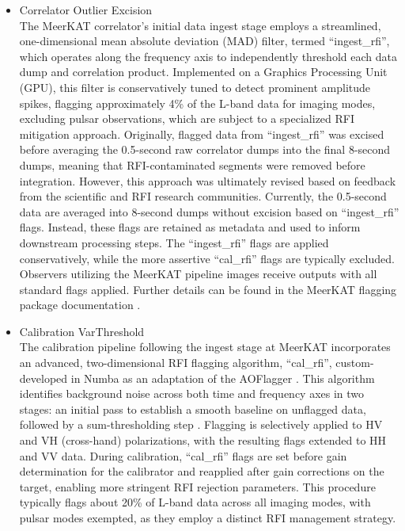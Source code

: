 \begin{itemize}
\item Correlator Outlier Excision\\
The MeerKAT correlator's initial data ingest stage employs a streamlined, one-dimensional mean absolute deviation (MAD) filter, termed ``ingest\_rfi'', which operates along the frequency axis to independently threshold each data dump and correlation product. Implemented on a Graphics Processing Unit (GPU), this filter is conservatively tuned to detect prominent amplitude spikes, flagging approximately 4\% of the L-band data for imaging modes, excluding pulsar observations, which are subject to a specialized RFI mitigation approach. Originally, flagged data from ``ingest\_rfi'' was excised before averaging the 0.5-second raw correlator dumps into the final 8-second dumps, meaning that RFI-contaminated segments were removed before integration. However, this approach was ultimately revised based on feedback from the scientific and RFI research communities.
Currently, the 0.5-second data are averaged into 8-second dumps without excision based on ``ingest\_rfi'' flags. Instead, these flags are retained as metadata and used to inform downstream processing steps.
The ``ingest\_rfi'' flags are applied conservatively, while the more assertive ``cal\_rfi'' flags are typically excluded. Observers utilizing the MeerKAT pipeline images receive outputs with all standard flags applied. Further details can be found in the MeerKAT flagging package documentation \citep{hugo2022tricolouroptimizedsumthresholdflagger}.

\item Calibration VarThreshold\\
The calibration pipeline following the ingest stage at MeerKAT incorporates an advanced, two-dimensional RFI flagging algorithm, ``cal\_rfi'', custom-developed in Numba as an adaptation of the AOFlagger \cite{offringa2010lofarrfidetectionpipeline}. This algorithm identifies background noise across both time and frequency axes in two stages: an initial pass to establish a smooth baseline on unflagged data, followed by a sum-thresholding step \cite{sihlangu2019meerkat}. Flagging is selectively applied to HV and VH (cross-hand) polarizations, with the resulting flags extended to HH and VV data. During calibration, ``cal\_rfi'' flags are set before gain determination for the calibrator and reapplied after gain corrections on the target, enabling more stringent RFI rejection parameters. This procedure typically flags about 20\% of L-band data across all imaging modes, with pulsar modes exempted, as they employ a distinct RFI management strategy.


\end{itemize}

